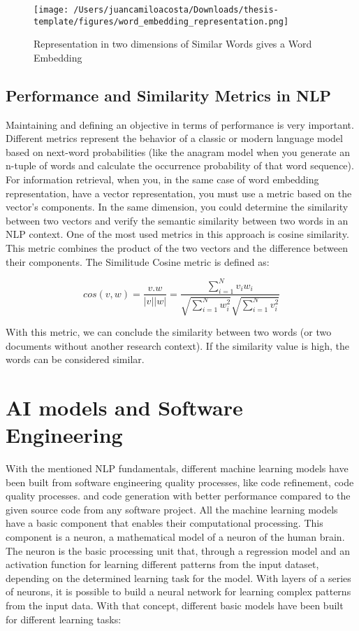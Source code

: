     \begin{figure}[H]
    \centering
    \texttt{[image: /Users/juancamiloacosta/Downloads/thesis-template/figures/word\_embedding\_representation.png]}
    \caption{Representation in two dimensions of Similar Words gives a Word Embedding \citet{nlp-fundamentals} }
    \label{fig:word-embedding}
    \end{figure}

\subsection{Performance and Similarity Metrics in NLP}
Maintaining and defining an objective in terms of performance is very important. Different metrics represent the behavior of a classic or modern language model based on next-word probabilities (like the anagram model when you generate an n-tuple of words and calculate the occurrence probability of that word sequence). For information retrieval, when you, in the same case of word embedding representation, have a vector representation, you must use a metric based on the vector's components. In the same dimension, you could determine the similarity between two vectors and verify the semantic similarity between two words in an NLP context. One of the most used metrics in this approach is cosine similarity. This metric combines the product of the two vectors and the difference between their components. The Similitude Cosine metric is defined as:

\begin{equation}
cos(v,w) = \frac{v.w}{|v||w|} = \frac{\sum_{i=1}^{N} v_{i}w_{i}}{\sqrt{\sum_{i=1}^{N} w_{i}^{2}} \sqrt{\sum_{i=1}^{N} v_{i}^{2}}}
\end{equation}

With this metric, we can conclude the similarity between two words (or two documents without another research context). If the similarity value is high, the words can be considered similar.

\section{AI models and Software Engineering}
With the mentioned NLP fundamentals, different machine learning models have been built from software engineering quality processes, like code refinement, code quality processes. and code generation with better performance compared to the given source code from any software project. All the machine learning models have a basic component that enables their computational processing. This component is a neuron, a mathematical model of a neuron of the human brain. The neuron is the basic processing unit that, through a regression model and an activation function for learning different patterns from the input dataset, depending on the determined learning task for the model. With layers of a series of neurons, it is possible to build a neural network for learning complex patterns from the input data.
With that concept, different basic models have been built for different learning tasks:

